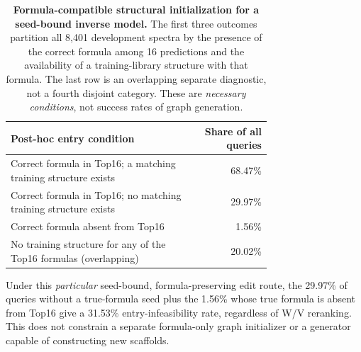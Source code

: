 \begin{table}[!htbp]
\centering
\caption{\textbf{Formula-compatible structural initialization for a seed-bound inverse model.} The first three outcomes partition all 8,401 development spectra by the presence of the correct formula among 16 predictions and the availability of a training-library structure with that formula. The last row is an overlapping separate diagnostic, not a fourth disjoint category. These are \emph{necessary conditions}, not success rates of graph generation.}
\label{tab:msdev_entry}
\small
\begin{tabular}{p{0.73\linewidth}r}
\toprule
Post-hoc entry condition & Share of all queries \\
\midrule
Correct formula in Top16; a matching training structure exists & 68.47\% \\
Correct formula in Top16; no matching training structure exists & 29.97\% \\
Correct formula absent from Top16 & 1.56\% \\
\midrule
No training structure for any of the Top16 formulas (overlapping) & 20.02\% \\
\bottomrule
\end{tabular}

\vspace{3pt}
\begin{minipage}{0.97\linewidth}\footnotesize
Under this \emph{particular} seed-bound, formula-preserving edit route, the 29.97\% of queries without a true-formula seed plus the 1.56\% whose true formula is absent from Top16 give a 31.53\% entry-infeasibility rate, regardless of W/V reranking. This does not constrain a separate formula-only graph initializer or a generator capable of constructing new scaffolds.
\end{minipage}
\end{table}

